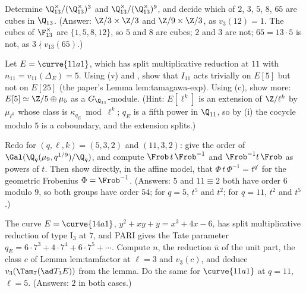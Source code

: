 \begin{exercise}\label{ex:local:ex-cubes13}
Determine $\Q_{13}^\times/(\Q_{13}^\times)^3$ and $\Q_{13}^\times/(\Q_{13}^\times)^9$, and decide which of $2$, $3$, $5$, $8$, $65$ are cubes in $\Q_{13}$.
(Answer: $\Z/3\times\Z/3$ and $\Z/9\times\Z/3$, as $v_3(12)=1$. The cubes of $\F_{13}^\times$ are $\{1,5,8,12\}$, so $5$ and $8$ are cubes; $2$ and $3$ are not;
$65=13\cdot5$ is not, as $3\nmid v_{13}(65)$.)
\end{exercise}

\begin{exercise}\label{ex:local:ex-11a1}
Let $E=\curve{11a1}$, which has split multiplicative reduction at $11$ with $n_{11}=v_{11}(\Delta_E)=5$. Using (v) and
, show that $I_{11}$ acts trivially on $E[5]$ but not on $E[25]$ (the paper's Lemma lem:tamagawa-exp). Using (c),
show more: $E[5]\simeq\Z/5\oplus\mu_5$ as a $G_{\Q_{11}}$-module. (Hint: $E[\ell^k]$ is an extension of $\Z/\ell^k$ by $\mu_{\ell^k}$ whose class is $\kappa_{q_E}\bmod\ell^k$;
$q_E$ is a fifth power in $\Q_{11}$, so by (i) the cocycle modulo $5$ is a coboundary, and the extension splits.)
\end{exercise}

\begin{exercise}\label{ex:local:ex-tame-level}
Redo  for $(q,\ell,k)=(5,3,2)$ and $(11,3,2)$: give the order of $\Gal(\Q_q(\mu_9,q^{1/9})/\Q_q)$, and compute $\Frob\,t\,\Frob^{-1}$ and
$\Frob^{-1}t\,\Frob$ as powers of $t$. Then show directly, in the affine model, that $\Phi\,t\,\Phi^{-1}=t^{q'}$ for the geometric Frobenius $\Phi=\Frob^{-1}$.
(Answers: $5$ and $11\equiv2$ both have order $6$ modulo $9$, so both groups have order $54$; for $q=5$, $t^5$ and $t^2$; for $q=11$, $t^2$ and $t^5$.)
\end{exercise}

\begin{exercise}\label{ex:local:ex-14a1}
The curve $E=\curve{14a1}$, $y^2+xy+y=x^3+4x-6$, has split multiplicative reduction of type $\mathrm{I}_3$ at $7$, and PARI gives the Tate parameter
$q_E=6\cdot7^3+4\cdot7^4+6\cdot7^5+\cdots$. Compute $n$, the reduction $\bar u$ of the unit part, the class $c$ of Lemma lem:tamfactor at $\ell=3$ and $v_3(c)$, and deduce
$v_3(\Tam_7(\ad T_3E))$ from the lemma. Do the same for $\curve{11a1}$ at $q=11$, $\ell=5$. (Answers: $2$ in both cases.)
\end{exercise}

